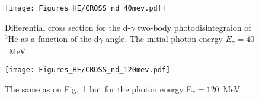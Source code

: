 \begin{figure}[h]
    \begin{center}
        \texttt{[image: Figures\_HE/CROSS\_nd\_40mev.pdf]}
        \end{center}
        \caption{Differential cross section for the d-$\gamma$ 
        two-body photodisintegraion of $^3$He as a function of the d$\gamma$ angle.
        The initial photon energy $E_\gamma=40$~MeV.}
        \label{CROSS_nd_40}
    \end{figure}

    \begin{figure}[h]
        \begin{center}
        \texttt{[image: Figures\_HE/CROSS\_nd\_120mev.pdf]}
        \end{center}
        \caption{The same as on Fig.~\ref{CROSS_nd_40} but 
        for the photon energy E$_\gamma=120$~MeV}
        \label{CROSS_nd_120}
    \end{figure}